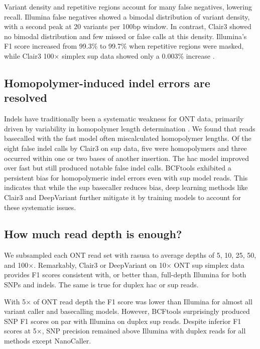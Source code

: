 \documentclass[11pt]{article}
\begin{document}
Variant density and repetitive regions account for many false negatives, lowering recall. Illumina false negatives showed a bimodal distribution of variant density, with a second peak at 20 variants per 100bp window. In contrast, Clair3 showed no bimodal distribution and few missed or false calls at this density. Illumina's F1 score increased from 99.3\% to 99.7\% when repetitive regions were masked, while Clair3 100$\times$ simplex sup data showed only a 0.003\% increase \citep{treangen2012}.

\subsection{Homopolymer-induced indel errors are resolved}

Indels have traditionally been a systematic weakness for ONT data, primarily driven by variability in homopolymer length determination \citep{delahaye2021}. We found that reads basecalled with the fast model often miscalculated homopolymer lengths. Of the eight false indel calls by Clair3 on sup data, five were homopolymers and three occurred within one or two bases of another insertion. The hac model improved over fast but still produced notable false indel calls. BCFtools exhibited a persistent bias for homopolymeric indel errors even with sup model reads. This indicates that while the sup basecaller reduces bias, deep learning methods like Clair3 and DeepVariant further mitigate it by training models to account for these systematic issues.

\subsection{How much read depth is enough?}

We subsampled each ONT read set with rasusa \citep{hall2022} to average depths of 5, 10, 25, 50, and 100$\times$. Remarkably, Clair3 or DeepVariant on 10$\times$ ONT sup simplex data provides F1 scores consistent with, or better than, full-depth Illumina for both SNPs and indels. The same is true for duplex hac or sup reads.

With 5$\times$ of ONT read depth the F1 score was lower than Illumina for almost all variant caller and basecalling models. However, BCFtools surprisingly produced SNP F1 scores on par with Illumina on duplex sup reads. Despite inferior F1 scores at 5$\times$, SNP precision remained above Illumina with duplex reads for all methods except NanoCaller.
\end{document}
